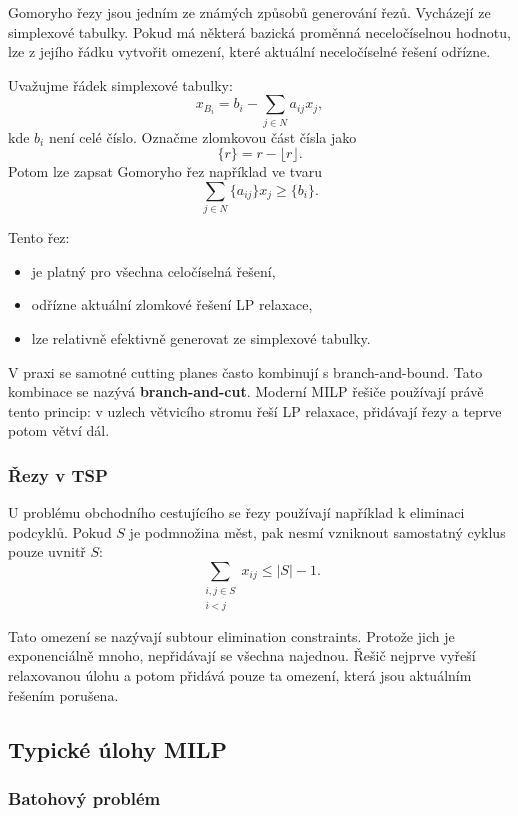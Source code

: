 Gomoryho řezy jsou jedním ze známých způsobů generování řezů. Vycházejí ze simplexové tabulky.
Pokud má některá bazická proměnná neceločíselnou hodnotu, lze z jejího řádku vytvořit omezení,
které aktuální neceločíselné řešení odřízne.

Uvažujme řádek simplexové tabulky:
\[
x_{B_i}=b_i-\sum_{j\in N}a_{ij}x_j,
\]
kde $b_i$ není celé číslo. Označme zlomkovou část čísla jako
\[
\{r\}=r-\lfloor r\rfloor.
\]
Potom lze zapsat Gomoryho řez například ve tvaru
\[
\sum_{j\in N}\{a_{ij}\}x_j \ge \{b_i\}.
\]

Tento řez:
\begin{itemize}
    \item je platný pro všechna celočíselná řešení,
    \item odřízne aktuální zlomkové řešení LP relaxace,
    \item lze relativně efektivně generovat ze simplexové tabulky.
\end{itemize}

V praxi se samotné cutting planes často kombinují s branch-and-bound. Tato kombinace se nazývá
\textbf{branch-and-cut}. Moderní MILP řešiče používají právě tento princip: v uzlech větvicího stromu
řeší LP relaxace, přidávají řezy a teprve potom větví dál.

\subsubsection{Řezy v TSP}

U problému obchodního cestujícího se řezy používají například k eliminaci podcyklů. Pokud $S$ je
podmnožina měst, pak nesmí vzniknout samostatný cyklus pouze uvnitř $S$:
\[
\sum_{\substack{i,j\in S\\ i<j}}x_{ij}\le |S|-1.
\]

Tato omezení se nazývají subtour elimination constraints. Protože jich je exponenciálně mnoho,
nepřidávají se všechna najednou. Řešič nejprve vyřeší relaxovanou úlohu a potom přidává pouze ta
omezení, která jsou aktuálním řešením porušena.

\subsection{Typické úlohy MILP}

\subsubsection{Batohový problém}


